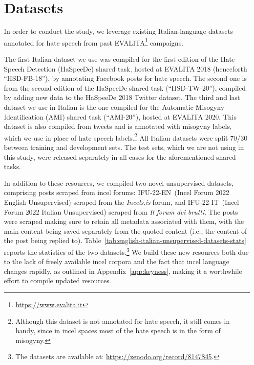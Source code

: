\documentclass[11pt]{article}
\newcommand{\dsENcorpus}{IFU-22-EN}
\newcommand{\dsITcorpus}{IFU-22-IT}
\begin{document}
\section{Datasets}
\label{sec:ceur-specs}

In order to conduct the study, we leverage existing Italian-language datasets annotated for hate speech from past EVALITA\footnote{\url{https://www.evalita.it}} campaigns.

The first Italian dataset we use was compiled for the first edition of the Hate Speech Detection (HaSpeeDe) shared task, hosted at EVALITA 2018 \cite{boscoOverviewEVALITA2018} (henceforth ``HSD-FB-18''), by annotating Facebook posts for hate speech. The second one is from the second edition of the HaSpeeDe shared task \cite{basileEVALITA2020Overview} (``HSD-TW-20''), compiled by adding new data to the HaSpeeDe 2018 Twitter dataset. The third and last dataset we use in Italian is the one compiled for the Automatic Misogyny Identification (AMI) shared task \cite{fersiniAMIEVALITA2020Automatic2020} (``AMI-20''), hosted at EVALITA 2020. This dataset is also compiled from tweets and is annotated with misogyny labels, which we use in place of hate speech labels.\footnote{Although this dataset is not annotated for hate speech, it still comes in handy, since in incel spaces most of the hate speech is in the form of misogyny.} All Italian datasets were split 70/30 between training and development sets. The test sets, which we are not using in this study, were released separately in all cases for the aforementioned shared tasks. 

In addition to these resources, we compiled two novel unsupervised datasets, comprising posts scraped from incel forums: \dsENcorpus\, (Incel Forum 2022 English Unsupervised) scraped from the \textit{Incels.is} forum, and \dsITcorpus\, (Incel Forum 2022 Italian Unsupervised) scraped from \textit{Il forum dei brutti}. The posts were scraped making sure to retain all metadata associated with them, with the main content being saved separately from the quoted content (i.e., the content of the post being replied to). Table~\ref{tab:english-italian-unsupervised-datasets-stats} reports the statistics of the two datasets.\footnote{The datasets are available at: \url{https://zenodo.org/record/8147845}.} We build these new resources both due to the lack of freely available incel corpora and the fact that incel language changes rapidly, as outlined in Appendix~\ref{app:keyness}, making it a worthwhile effort to compile updated resources.
\end{document}
